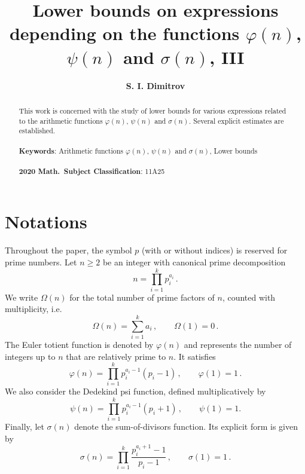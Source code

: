 \documentclass[12pt]{article}
\begin{document}
\title{\bf  Lower bounds on expressions depending on the functions {\boldmath$\varphi(n)$}, {\boldmath$\psi(n)$} and {\boldmath$\sigma(n)$}, III}

\author{\bf S. I. Dimitrov}

\date{}

\maketitle

\begin{abstract}
This work is concerned with the study of lower bounds for various expressions related to the arithmetic functions $\varphi(n)$, $\psi(n)$ and $\sigma(n)$. Several explicit estimates are established.\\
\quad\\
\textbf{Keywords}: Arithmetic functions $\varphi(n)$, $\psi(n)$ and $\sigma(n)$, Lower bounds\\
\quad\\
{\bf  2020 Math.\ Subject Classification}: 11A25
\end{abstract}


\section{Notations}

Throughout the paper, the symbol $p$ (with or without indices) is reserved for prime numbers.
Let $n \ge 2$ be an integer with canonical prime decomposition
\begin{equation*}
n = \prod_{i=1}^k p_i^{a_i}\,.
\end{equation*}
We write $\Omega(n)$ for the total number of prime factors of $n$, counted with multiplicity, i.e.
\begin{equation*}
\Omega(n) = \sum_{i=1}^k a_i\,, \qquad \Omega(1)=0\,.
\end{equation*}
The Euler totient function is denoted by $\varphi(n)$ and represents the number of integers up to $n$ that are relatively prime to $n$. It satisfies
\begin{equation*}
\varphi(n) = \prod_{i=1}^k p_i^{a_i-1}(p_i - 1)\,, \qquad \varphi(1)=1\,.
\end{equation*}
We also consider the Dedekind psi function, defined multiplicatively by
\begin{equation*}
\psi(n) = \prod_{i=1}^k p_i^{a_i-1}(p_i + 1)\,, \qquad \psi(1)=1.
\end{equation*}
Finally, let $\sigma(n)$ denote the sum-of-divisors function. Its explicit form is given by
\begin{equation*}
\sigma(n) = \prod_{i=1}^k \frac{p_i^{a_i+1}-1}{p_i-1}\,, \qquad \sigma(1)=1\,.
\end{equation*}
\end{document}
